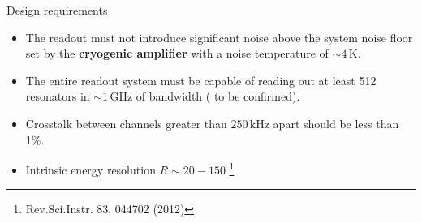 \documentclass[ignorenonframetext,12pt]{beamer}
\begin{document}
%
%
%
%
%
%

\begin{frame}{Design requirements}
				\begin{itemize}
								\item The readout must not introduce significant noise above the
												system noise floor set by the \textbf{cryogenic
												amplifier} with a noise temperature of $\sim
												4\,\text{K}$.
								\item The entire readout system must be capable of
												reading out at least \alert{512 resonators} in $\sim
												1\,\text{GHz}$ of bandwidth ({\color{red} to be
												confirmed}).
								\item \alert{Crosstalk} between channels greater than
												$250\,\text{kHz}$ apart should be less than \alert{1\%}.
								\item Intrinsic energy resolution \alert{$R \sim 20-150$}
												\footnote{Rev.Sci.Instr. 83, 044702 (2012)}
				\end{itemize}
\end{frame}
\end{document}
